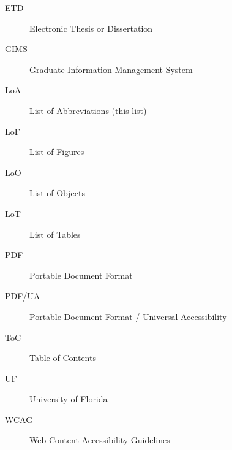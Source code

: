 
\begin{description}
    \item[ETD] Electronic Thesis or Dissertation
    \item[GIMS] Graduate Information Management System
    \item[LoA] List of Abbreviations (this list)
    \item[LoF] List of Figures
    \item[LoO] List of Objects
    \item[LoT] List of Tables
    \item[PDF] Portable Document Format
    \item[PDF/UA] Portable Document Format / Universal Accessibility
    \item[ToC] Table of Contents
    \item[UF] University of Florida
    \item[WCAG] Web Content Accessibility Guidelines
\end{description}
